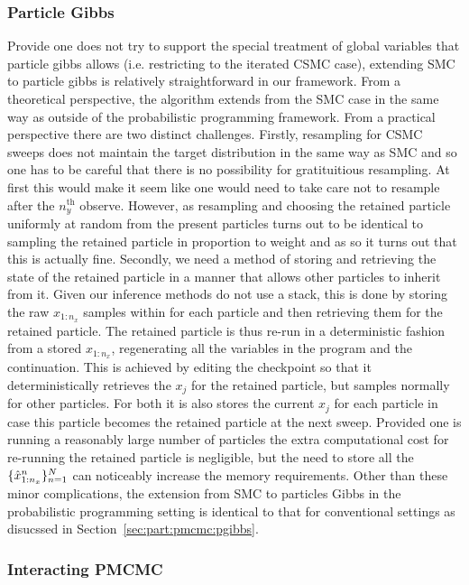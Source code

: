 \subsubsection{Particle Gibbs}
\label{sec:proginf:str:part:pgibbs}

Provide one does not try to support the special treatment of global variables that particle
gibbs allows (i.e. restricting to the iterated CSMC case), extending SMC to particle gibbs
is relatively straightforward in our framework.  From a theoretical perspective, the algorithm
extends from the SMC case in the same way as outside of the probabilistic programming framework.
From a practical perspective there are two distinct challenges. Firstly, resampling for CSMC
sweeps does not maintain the target distribution in the same way as SMC and so one has
to be careful that there is no possibility for gratituitious resampling.  At first this would make it
seem like one would need to take care not to resample after the $n_y^{\mathrm{th}}$ observe.
However, as resampling and choosing the retained particle uniformly at random from the
present particles turns out to be identical to sampling the retained particle in proportion to weight and
as so it turns out that this is actually fine.  Secondly, we need a method of storing and retrieving the
state of the retained particle in a manner that allows other particles to inherit from it.  Given our
inference methods do not use a stack, this is done by storing the raw $x_{1:n_x}$ samples within
\angstate for each particle and then retrieving them for the retained particle.  The retained
particle is thus re-run in a deterministic fashion from a stored $x_{1:n_x}$, regenerating
all the variables in the program and the continuation.  This is achieved by
editing the \sample checkpoint so that it deterministically retrieves the $x_j$ for the 
retained particle, but samples normally for other particles.  For both it is also stores the current
$x_j$ for each particle in case this particle becomes the retained particle at the next sweep.
Provided one is running a reasonably large number of particles the extra computational cost for
re-running the retained particle is negligible, but the need to store all the $\{\hat{x}_{1:n_x}^n\}_{n=1}^{N}$
can noticeably increase the memory requirements.  Other than these minor complications, the
extension from SMC to particles Gibbs in the probabilistic programming setting is identical to
that for conventional settings as disucssed in Section~\ref{sec:part:pmcmc:pgibbs}.

\subsubsection{Interacting PMCMC}
\label{sec:proginf:str:part:ipmcmc}

